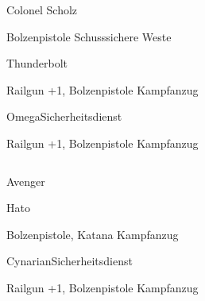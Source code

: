 \begin{column}[l]{0.45}
    \begin{nscsheet}[h]{Colonel Scholz}
        \nscstats[ATT=2,AGG=2,COM=3]
        \nscruler
        \begin{nscinventory}
            \nscitem[Waffen] Bolzenpistole
            \nscitem[R"ustung] Schusssichere Weste
        \end{nscinventory}
    \end{nscsheet}

    \begin{nscsheet}[h]{Thunderbolt}
        \nscstats[ATT=3,AGG=3,CON=2]
        \nscruler
        \begin{nscinventory}
            \nscitem[Waffen] Railgun +1, Bolzenpistole
            \nscitem[R"ustung] Kampfanzug
        \end{nscinventory}
    \end{nscsheet}

    \begin{nscsheet}[h]{Omega\newline{}Sicherheitsdienst}
        \nscstats[ATT=3,AGG=3,CON=2]
        \nscruler
        \begin{nscinventory}
            \nscitem[Waffen] Railgun +1, Bolzenpistole
            \nscitem[R"ustung] Kampfanzug
        \end{nscinventory}
    \end{nscsheet}    
\end{column}
\begin{column}[r]{0.45}
    \begin{nscsheet}[h]{Avenger}
        \nscstats[ATT=2,AGG=2,DEX=2,COM=3,CON=2]
        \nscruler
    \end{nscsheet}
    
    \begin{nscsheet}[h]{Hato}
        \nscstats[ATT=3,AGG=3,CON=2]
        \nscruler
        \begin{nscinventory}
            \nscitem[Waffen] Bolzenpistole, Katana
            \nscitem[R"ustung] Kampfanzug
        \end{nscinventory}
    \end{nscsheet}

    \begin{nscsheet}[h]{Cynarian\newline{}Sicherheitsdienst}
        \nscstats[ATT=2,AGG=2]
        \nscruler
        \begin{nscinventory}
            \nscitem[Waffen] Railgun +1, Bolzenpistole
            \nscitem[R"ustung] Kampfanzug        
        \end{nscinventory}
    \end{nscsheet}    
\end{column}

